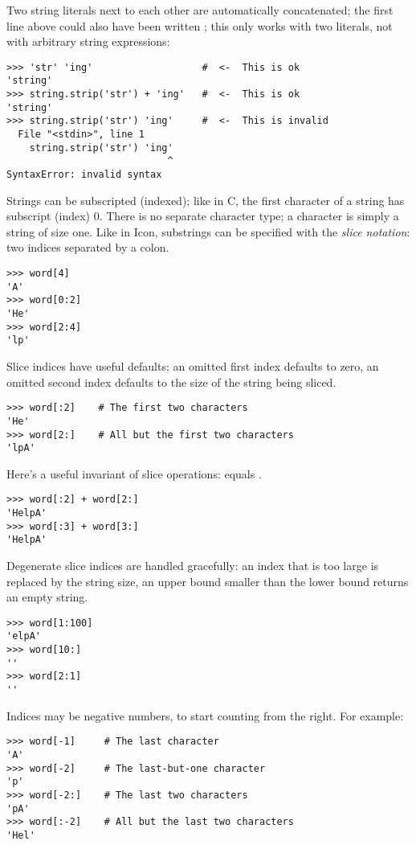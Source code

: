 \documentclass{manual}
\begin{document}
Two string literals next to each other are automatically concatenated;
the first line above could also have been written ; this only works with two literals, not with arbitrary string
expressions:

\begin{verbatim}
>>> 'str' 'ing'                   #  <-  This is ok
'string'
>>> string.strip('str') + 'ing'   #  <-  This is ok
'string'
>>> string.strip('str') 'ing'     #  <-  This is invalid
  File "<stdin>", line 1
    string.strip('str') 'ing'
                            ^
SyntaxError: invalid syntax
\end{verbatim}

Strings can be subscripted (indexed); like in C, the first character
of a string has subscript (index) 0.  There is no separate character
type; a character is simply a string of size one.  Like in Icon,
substrings can be specified with the \emph{slice notation}: two indices
separated by a colon.

\begin{verbatim}
>>> word[4]
'A'
>>> word[0:2]
'He'
>>> word[2:4]
'lp'
\end{verbatim}

Slice indices have useful defaults; an omitted first index defaults to
zero, an omitted second index defaults to the size of the string being
sliced.

\begin{verbatim}
>>> word[:2]    # The first two characters
'He'
>>> word[2:]    # All but the first two characters
'lpA'
\end{verbatim}

Here's a useful invariant of slice operations: 
equals .

\begin{verbatim}
>>> word[:2] + word[2:]
'HelpA'
>>> word[:3] + word[3:]
'HelpA'
\end{verbatim}

Degenerate slice indices are handled gracefully: an index that is too
large is replaced by the string size, an upper bound smaller than the
lower bound returns an empty string.

\begin{verbatim}
>>> word[1:100]
'elpA'
>>> word[10:]
''
>>> word[2:1]
''
\end{verbatim}

Indices may be negative numbers, to start counting from the right.
For example:

\begin{verbatim}
>>> word[-1]     # The last character
'A'
>>> word[-2]     # The last-but-one character
'p'
>>> word[-2:]    # The last two characters
'pA'
>>> word[:-2]    # All but the last two characters
'Hel'
\end{verbatim}
\end{document}
